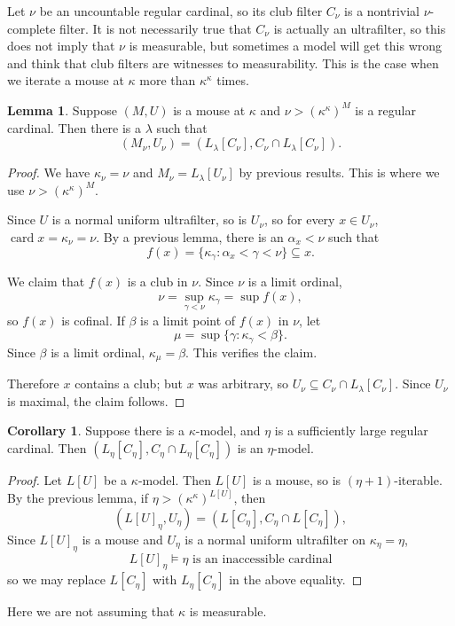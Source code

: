 \documentclass[12pt]{report}
\newcommand{\card}{\operatorname{card}}
\theoremstyle{definition}
\newtheorem{lemma}[theorem]{Lemma}
\newtheorem{corollary}[theorem]{Corollary}
\begin{document}
Let $\nu$ be an uncountable regular cardinal, so its club filter $C_\nu$ is a nontrivial $\nu$-complete filter.
It is not necessarily true that $C_\nu$ is actually an ultrafilter, so this does not imply that $\nu$ is measurable, but sometimes a model will get this wrong and think that club filters are witnesses to measurability.
This is the case when we iterate a mouse at $\kappa$ more than $\kappa^\kappa$ times.
\begin{lemma}
Suppose $(M, U)$ is a mouse at $\kappa$ and $\nu > (\kappa^\kappa)^M$ is a regular cardinal. Then there is a $\lambda$ such that
$$(M_\nu, U_\nu) = (L_\lambda[C_\nu], C_\nu \cap L_\lambda[C_\nu]).$$
\end{lemma}
\begin{proof}
We have $\kappa_\nu = \nu$ and $M_\nu = L_\lambda[U_\nu]$ by previous results. This is where we use $\nu > (\kappa^\kappa)^M$.

Since $U$ is a normal uniform ultrafilter, so is $U_\nu$, so for every $x \in U_\nu$, $\card x = \kappa_\nu = \nu$.
By a previous lemma, there is an $\alpha_x < \nu$ such that
$$f(x) = \{\kappa_\gamma: \alpha_x < \gamma < \nu\} \subseteq x.$$

We claim that $f(x)$ is a club in $\nu$. Since $\nu$ is a limit ordinal,
$$\nu = \sup_{\gamma < \nu} \kappa_\gamma = \sup f(x),$$
so $f(x)$ is cofinal.
If $\beta$ is a limit point of $f(x)$ in $\nu$, let
$$\mu = \sup \{\gamma: \kappa_\gamma < \beta\}.$$
Since $\beta$ is a limit ordinal, $\kappa_\mu = \beta$. This verifies the claim.

Therefore $x$ contains a club; but $x$ was arbitrary, so $U_\nu \subseteq C_\nu \cap L_\lambda[C_\nu]$.
Since $U_\nu$ is maximal, the claim follows.
\end{proof}
\begin{corollary}
Suppose there is a $\kappa$-model, and $\eta$ is a sufficiently large regular cardinal. Then $(L_\eta[C_\eta], C_\eta \cap L_\eta[C_\eta])$ is an $\eta$-model.
\end{corollary}
\begin{proof}
Let $L[U]$ be a $\kappa$-model. Then $L[U]$ is a mouse, so is $(\eta + 1)$-iterable. By the previous lemma, if $\eta > (\kappa^\kappa)^{L[U]}$, then
$$(L[U]_\eta, U_\eta) = (L[C_\eta], C_\eta \cap L[C_\eta]),$$
Since $L[U]_\eta$ is a mouse and $U_\eta$ is a normal uniform ultrafilter on $\kappa_\eta = \eta$,
$$L[U]_\eta \models \text{$\eta$ is an inaccessible cardinal}$$
so we may replace $L[C_\eta]$ with $L_\eta[C_\eta]$ in the above equality.
\end{proof}
Here we are not assuming that $\kappa$ is measurable.
\end{document}
